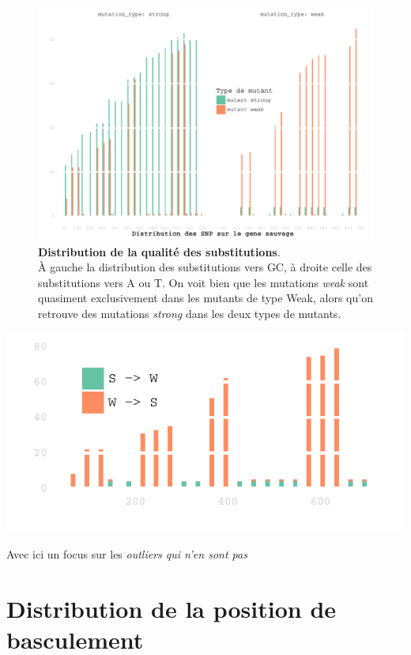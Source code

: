 \documentclass[a4paper]{tufte-handout}
\begin{document}
\begin{figure}[h]
  \centering
  \includegraphics[width=\linewidth]{../muttype_plot.pdf}
  \caption{\textbf{Distribution de la qualité des substitutions}. \\
    À gauche la distribution des substitutions vers GC, à droite celle des
    substitutions vers A ou T. On voit bien que les mutations \emph{weak} sont
    quasiment exclusivement dans les mutants de type Weak, alors qu'on retrouve
    des mutations \emph{strong} dans les deux types de mutants.}
  \label{figure3}
\end{figure}

\begin{marginfigure}
  \includegraphics[width=\linewidth]{../outliers.pdf}
  \caption{Avec ici un focus sur les \em{outliers} qui n'en sont pas}

\end{marginfigure}

\clearpage
\section{Distribution de la position de basculement}
\label{sec:orgheadline11}
\end{document}
